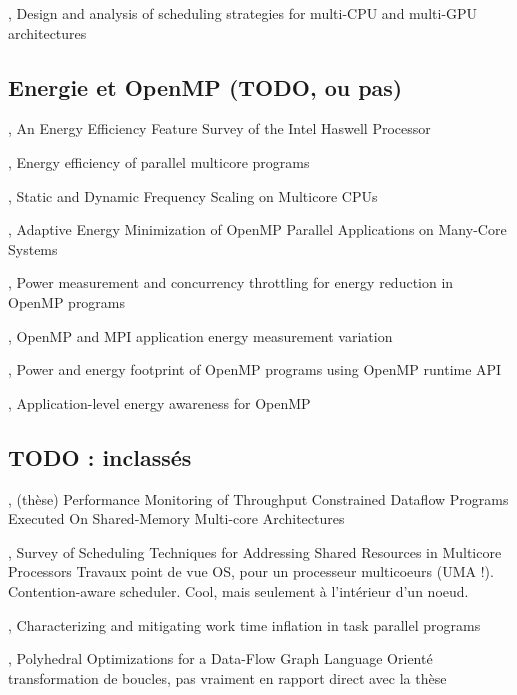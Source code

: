 \cite{Lima2015}, Design and analysis of scheduling strategies for multi-CPU and multi-GPU architectures



\subsection{Energie et OpenMP (TODO, ou pas)}


\cite{Hackenberg2015}, An Energy Efficiency Feature Survey of the Intel Haswell Processor

\cite{Davidovic2015}, Energy efficiency of parallel multicore programs

\cite{Bao2016}, Static and Dynamic Frequency Scaling on Multicore CPUs

\cite{Shafik2015}, Adaptive Energy Minimization of OpenMP Parallel Applications on Many-Core Systems

\cite{Porterfield2013}, Power measurement and concurrency throttling for energy reduction in OpenMP programs

\cite{Porterfield2013a}, OpenMP and MPI application energy measurement variation

\cite{Nandamuri2015}, Power and energy footprint of OpenMP programs using OpenMP runtime API

\cite{Alessi2015}, Application-level energy awareness for OpenMP


\subsection{TODO : inclassés}

\cite{Selva2015}, (thèse) Performance Monitoring of Throughput Constrained Dataflow Programs Executed On Shared-Memory Multi-core Architectures

\cite{Zhuravlev2012}, Survey of Scheduling Techniques for Addressing Shared Resources in Multicore Processors
Travaux point de vue OS, pour un processeur multicoeurs (UMA !).
Contention-aware scheduler.
Cool, mais seulement à l'intérieur d'un noeud.

\cite{Olivier2013}, Characterizing and mitigating work time inflation in task parallel programs


\cite{Sbirlea2015}, Polyhedral Optimizations for a Data-Flow Graph Language
Orienté transformation de boucles, pas vraiment en rapport direct avec la thèse

